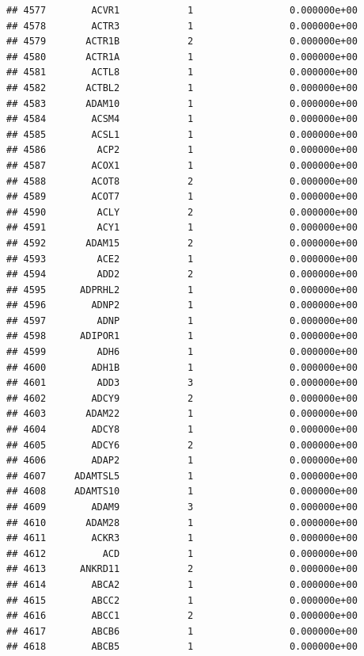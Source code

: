\documentclass[
]{article}
\begin{document}
\begin{verbatim}
## 4577        ACVR1            1                 0.000000e+00
## 4578        ACTR3            1                 0.000000e+00
## 4579       ACTR1B            2                 0.000000e+00
## 4580       ACTR1A            1                 0.000000e+00
## 4581        ACTL8            1                 0.000000e+00
## 4582       ACTBL2            1                 0.000000e+00
## 4583       ADAM10            1                 0.000000e+00
## 4584        ACSM4            1                 0.000000e+00
## 4585        ACSL1            1                 0.000000e+00
## 4586         ACP2            1                 0.000000e+00
## 4587        ACOX1            1                 0.000000e+00
## 4588        ACOT8            2                 0.000000e+00
## 4589        ACOT7            1                 0.000000e+00
## 4590         ACLY            2                 0.000000e+00
## 4591         ACY1            1                 0.000000e+00
## 4592       ADAM15            2                 0.000000e+00
## 4593         ACE2            1                 0.000000e+00
## 4594         ADD2            2                 0.000000e+00
## 4595      ADPRHL2            1                 0.000000e+00
## 4596        ADNP2            1                 0.000000e+00
## 4597         ADNP            1                 0.000000e+00
## 4598      ADIPOR1            1                 0.000000e+00
## 4599         ADH6            1                 0.000000e+00
## 4600        ADH1B            1                 0.000000e+00
## 4601         ADD3            3                 0.000000e+00
## 4602        ADCY9            2                 0.000000e+00
## 4603       ADAM22            1                 0.000000e+00
## 4604        ADCY8            1                 0.000000e+00
## 4605        ADCY6            2                 0.000000e+00
## 4606        ADAP2            1                 0.000000e+00
## 4607     ADAMTSL5            1                 0.000000e+00
## 4608     ADAMTS10            1                 0.000000e+00
## 4609        ADAM9            3                 0.000000e+00
## 4610       ADAM28            1                 0.000000e+00
## 4611        ACKR3            1                 0.000000e+00
## 4612          ACD            1                 0.000000e+00
## 4613      ANKRD11            2                 0.000000e+00
## 4614        ABCA2            1                 0.000000e+00
## 4615        ABCC2            1                 0.000000e+00
## 4616        ABCC1            2                 0.000000e+00
## 4617        ABCB6            1                 0.000000e+00
## 4618        ABCB5            1                 0.000000e+00

\end{verbatim}
\end{document}
